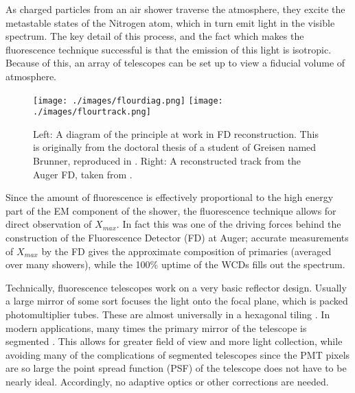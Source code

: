 As charged particles from an air shower traverse the atmosphere, they excite the metastable states of the Nitrogen atom, which in turn emit light in the visible spectrum. The key detail of this process, and the fact which makes the fluorescence technique successful is that the emission of this light is isotropic. Because of this, an array of telescopes can be set up to view a fiducial volume of atmosphere. 
\begin{figure}[h!]
\begin{center}
\texttt{[image: ./images/flourdiag.png]}
\texttt{[image: ./images/flourtrack.png]}
\caption[Fluorescence Reconstruction]{Left: A diagram of the principle at work in FD reconstruction. This is originally from the doctoral thesis of a student of Greisen named Brunner, reproduced in \cite{ultraray}. Right: A reconstructed track from the Auger FD, taken from \cite{fluorauger}.}
\label{fluorpics}
\end{center}
\end{figure}
Since the amount of fluorescence is effectively proportional to the high energy part of the EM component of the shower, the fluorescence technique allows for direct observation of $X_{max}$. In fact this was one of the driving forces behind the construction of the Fluorescence Detector (FD) at Auger; accurate measurements of $X_{max}$ by the FD gives the approximate composition of primaries (averaged over many showers), while the 100\% uptime of the WCDs fills out the spectrum. 

Technically, fluorescence telescopes work on a very basic reflector design. Usually a large mirror of some sort focuses the light onto the focal plane, which is packed photomultiplier tubes. These are almost universally in a hexagonal tiling \cite{flyseye}. In modern applications, many times the primary mirror of the telescope is segmented \cite{fluorauger}. This allows for greater field of view and more light collection, while avoiding many of the complications of segmented telescopes since the PMT pixels are so large the point spread function (PSF) of the telescope does not have to be nearly ideal. Accordingly, no adaptive optics or other corrections are needed. 

